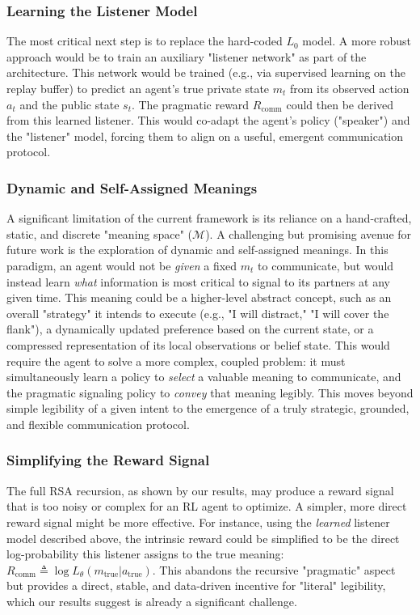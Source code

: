 \documentclass[12pt, a4paper]{report}
\newcommand{\Rcomm}{R_{\text{comm}}}
\begin{document}
\subsubsection{Learning the Listener Model}
The most critical next step is to replace the hard-coded $L_0$ model. A more robust approach would be to train an auxiliary "listener network" as part of the architecture. This network would be trained (e.g., via supervised learning on the replay buffer) to predict an agent's true private state $m_t$ from its observed action $a_t$ and the public state $s_t$. The pragmatic reward $\Rcomm$ could then be derived from this learned listener. This would co-adapt the agent's policy ("speaker") and the "listener" model, forcing them to align on a useful, emergent communication protocol.

\subsubsection{Dynamic and Self-Assigned Meanings}
A significant limitation of the current framework is its reliance on a hand-crafted, static, and discrete "meaning space" ($\mathcal{M}$). A challenging but promising avenue for future work is the exploration of dynamic and self-assigned meanings. In this paradigm, an agent would not be \textit{given} a fixed $m_t$ to communicate, but would instead learn \textit{what} information is most critical to signal to its partners at any given time. This meaning could be a higher-level abstract concept, such as an overall "strategy" it intends to execute (e.g., "I will distract," "I will cover the flank"), a dynamically updated preference based on the current state, or a compressed representation of its local observations or belief state. This would require the agent to solve a more complex, coupled problem: it must simultaneously learn a policy to \textit{select} a valuable meaning to communicate, and the pragmatic signaling policy to \textit{convey} that meaning legibly. This moves beyond simple legibility of a given intent to the emergence of a truly strategic, grounded, and flexible communication protocol.

\subsubsection{Simplifying the Reward Signal}
The full RSA recursion, as shown by our results, may produce a reward signal that is too noisy or complex for an RL agent to optimize. A simpler, more direct reward signal might be more effective. For instance, using the \textit{learned} listener model described above, the intrinsic reward could be simplified to be the direct log-probability this listener assigns to the true meaning: $\Rcomm \triangleq \log L_{\theta}(m_{\text{true}} | a_{\text{true}})$. This abandons the recursive "pragmatic" aspect but provides a direct, stable, and data-driven incentive for "literal" legibility, which our results suggest is already a significant challenge.
\end{document}
